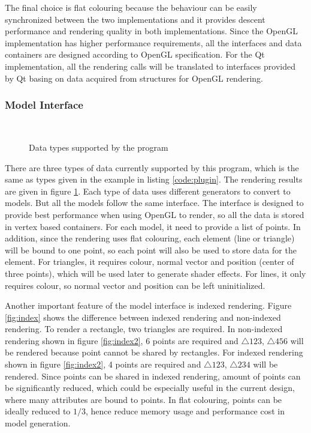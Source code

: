 The final choice is flat colouring because the behaviour can be easily synchronized between the two implementations and it provides descent performance and rendering quality in both implementations. Since the OpenGL implementation has higher performance requirements, all the interfaces and data containers are designed according to OpenGL specification. For the Qt implementation, all the rendering calls will be translated to interfaces provided by Qt basing on data acquired from structures for OpenGL rendering.

\subsubsection{Model Interface} \label{sec:model}

\begin{figure}[!tb]
	\centering
	 \\
	 \hspace{0.5em}
	\caption{Data types supported by the program}
	\label{fig:diagram}
\end{figure}

There are three types of data currently supported by this program, which is the same as types given in the example in listing \ref{code:plugin}. The rendering results are given in figure \ref{fig:diagram}. Each type of data uses different generators to convert to models. But all the models follow the same interface. The interface is designed to provide best performance when using OpenGL to render, so all the data is stored in vertex based containers. For each model, it need to provide a list of points. In addition, since the rendering uses flat colouring, each element (line or triangle) will be bound to one point, so each point will also be used to store data for the element. For triangles, it requires colour, normal vector and position (center of three points), which will be used later to generate shader effects. For lines, it only requires colour, so normal vector and position can be left uninitialized.

Another important feature of the model interface is indexed rendering. Figure \ref{fig:index} shows the difference between indexed rendering and non-indexed rendering. To render a rectangle, two triangles are required. In non-indexed rendering shown in figure \ref{fig:index2}, 6 points are required and $\triangle123$, $\triangle456$ will be rendered because point cannot be shared by rectangles. For indexed rendering shown in figure \ref{fig:index2}, 4 points are required and $\triangle123$, $\triangle234$ will be rendered. Since points can be shared in indexed rendering, amount of points can be significantly reduced, which could be especially useful in the current design, where many attributes are bound to points. In flat colouring, points can be ideally reduced to $1/3$, hence reduce memory usage and performance cost in model generation.

